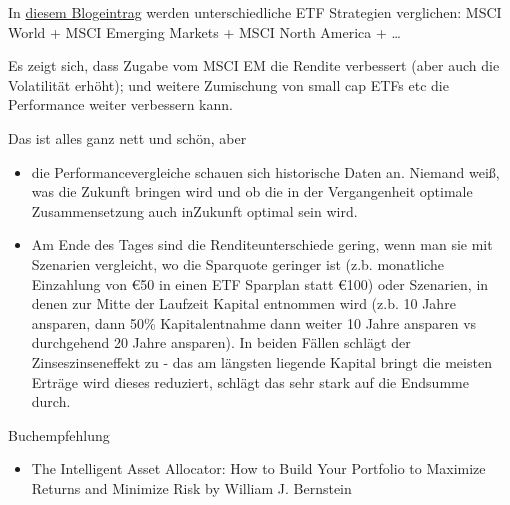 

In \href{http://www.finanzwesir.com/blog/etf-index-rendite-vergleich}{diesem Blogeintrag} werden unterschiedliche ETF Strategien verglichen: MSCI World + MSCI Emerging Markets + MSCI North America + \ldots{}

Es zeigt sich, dass Zugabe vom MSCI EM die Rendite verbessert (aber auch die Volatilität erhöht); und weitere Zumischung von small cap ETFs etc die Performance weiter verbessern kann.

Das ist alles ganz nett und schön, aber

\begin{itemize}
\item
  die Performancevergleiche schauen sich historische Daten an. Niemand weiß, was die Zukunft bringen wird und ob die in der Vergangenheit optimale Zusammensetzung auch inZukunft optimal sein wird.
\item
  Am Ende des Tages sind die Renditeunterschiede gering, wenn man sie mit Szenarien vergleicht, wo die Sparquote geringer ist (z.b. monatliche Einzahlung von €50 in einen ETF Sparplan statt €100) oder Szenarien, in denen zur Mitte der Laufzeit Kapital entnommen wird (z.b. 10 Jahre ansparen, dann 50\% Kapitalentnahme dann weiter 10 Jahre ansparen vs durchgehend 20 Jahre ansparen). In beiden Fällen schlägt der Zinseszinseneffekt zu - das am längsten liegende Kapital bringt die meisten Erträge wird dieses reduziert, schlägt das sehr stark auf die Endsumme durch.
\end{itemize}

Buchempfehlung

\begin{itemize}

\item
  The Intelligent Asset Allocator: How to Build Your Portfolio to Maximize Returns and Minimize Risk by William J. Bernstein
\end{itemize}
